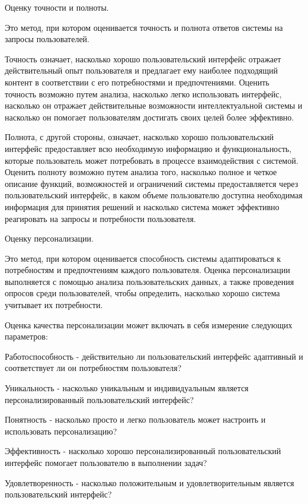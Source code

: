 \begin{textitemize}
	\item Оценку точности и полноты. 
	
	Это метод, при котором оценивается точность и полнота ответов системы на запросы пользователей.
	
	Точность означает, насколько хорошо пользовательский интерфейс отражает действительный опыт пользователя и предлагает ему наиболее подходящий контент в соответствии с его потребностями и предпочтениями. Оценить точность возможно путем анализа, насколько легко использовать интерфейс, насколько он отражает действительные возможности интеллектуальной системы и насколько он помогает пользователям достигать своих целей более эффективно.
	
	Полнота, с другой стороны, означает, насколько хорошо пользовательский интерфейс предоставляет всю необходимую информацию и функциональность, которые пользователь может потребовать в процессе взаимодействия с системой. Оценить полноту возможно путем анализа того, насколько полное и четкое описание функций, возможностей и ограничений системы предоставляется через пользовательский интерфейс, в каком объеме пользователю доступна необходимая информация для принятия решений и насколько система может эффективно реагировать на запросы и потребности пользователя.
	
	\item Оценку персонализации. 
	
	Это метод, при котором оценивается способность системы адаптироваться к потребностям и предпочтениям каждого пользователя. Оценка персонализации выполняется с помощью анализа пользовательских данных, а также проведения опросов среди пользователей, чтобы определить, насколько хорошо система учитывает их потребности.
	
	Оценка качества персонализации может включать в себя измерение следующих параметров:
	\begin{textitemize}
	\item Работоспособность - действительно ли пользовательский интерфейс адаптивный и соответствует ли он потребностям пользователя?
	\item Уникальность - насколько уникальным и индивидуальным является персонализированный пользовательский интерфейс?
	\item Понятность - насколько просто и легко пользователь может настроить и использовать персонализацию?
	\item Эффективность - насколько хорошо персонализированный пользовательский интерфейс помогает пользователю в выполнении задач?
	\item Удовлетворенность - насколько положительным и удовлетворительным является пользовательский интерфейс?
	\end{textitemize}


\end{textitemize}
